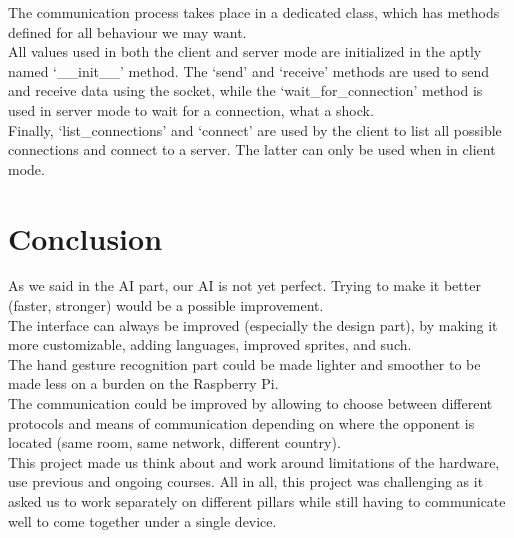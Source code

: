 \documentclass[11pt, a4paper, oneside]{report}
\begin{document}
	The communication process takes place in a dedicated class, which has methods defined for all behaviour we may want. \\
	All values used in both the client and server mode are initialized in the aptly named `\_\_init\_\_' method. The `send' and `receive' methods are used to send and receive data using the socket, while the `wait\_for\_connection' method is used in server mode to wait for a connection, what a shock. \\
	Finally, `list\_connections' and `connect' are used by the client to list all possible connections and connect to a server. The latter can only be used when in client mode.
	
	\chapter{Conclusion}
	As we said in the AI part, our AI is not yet perfect. Trying to make it better (faster, stronger) would be a possible improvement. \\
	The interface can always be improved (especially the design part), by making it more customizable, adding languages, improved sprites, and such. \\
	The hand gesture recognition part could be made lighter and smoother to be made less on a burden on the Raspberry Pi. \\
	The communication could be improved by allowing to choose between different protocols and means of communication depending on where the opponent is located (same room, same network, different country). \\

	This project made us think about and work around limitations of the hardware, use previous and ongoing courses. All in all, this project was challenging as it asked us to work separately on different pillars while still having to communicate well to come together under a single device.
\end{document}
